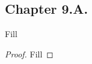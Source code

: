 \subsection*{Chapter 9.A. }


\begin{exercise}{1}
  Fill
\end{exercise}
\begin{proof}
 Fill
\end{proof}